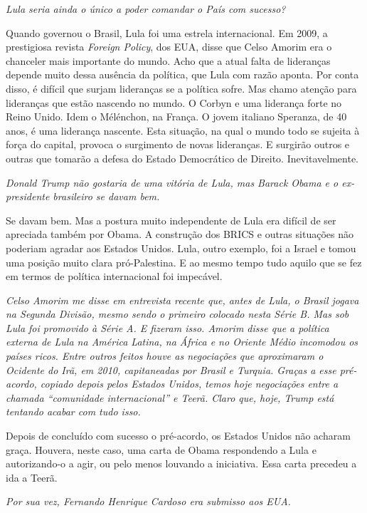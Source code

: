 \itshape
 Lula seria ainda o único a poder comandar o País com
sucesso?

\normalfont 
Quando governou o Brasil, Lula foi uma estrela
internacional. Em 2009, a prestigiosa revista \emph{Foreign Policy}, dos
EUA, disse que Celso Amorim era o chanceler mais importante do mundo.
Acho que a atual falta de lideranças depende muito dessa ausência da
política, que Lula com razão aponta. Por conta disso, é difícil que
surjam lideranças se a política sofre. Mas chamo atenção para lideranças
que estão nascendo no mundo. O Corbyn e uma liderança forte no Reino
Unido. Idem o Mélénchon, na França. O jovem italiano Speranza, de 40
anos, é uma liderança nascente. Esta situação, na qual o mundo todo se
sujeita à força do capital, provoca o surgimento de novas lideranças. E
surgirão outros e outras que tomarão a defesa do Estado Democrático de
Direito. Inevitavelmente.

\itshape
 Donald Trump não gostaria de uma vitória de Lula, mas
Barack Obama e o ex-presidente brasileiro se davam bem.

\normalfont 
Se davam bem. Mas a postura muito independente de Lula
era difícil de ser apreciada também por Obama. A construção dos BRICS e
outras situações não poderiam agradar aos Estados Unidos. Lula, outro
exemplo, foi a Israel e tomou uma posição muito clara pró-Palestina. E
ao mesmo tempo tudo aquilo que se fez em termos de política
internacional foi impecável.

\itshape
 Celso Amorim me disse em entrevista recente que, antes
de Lula, o Brasil jogava na Segunda Divisão, mesmo sendo o primeiro
colocado nesta Série B. Mas sob Lula foi promovido à Série A. E fizeram
isso. Amorim disse que a política externa de Lula na América Latina, na
África e no Oriente Médio incomodou os países ricos. Entre outros feitos
houve as negociações que aproximaram o Ocidente do Irã, em 2010,
capitaneadas por Brasil e Turquia. Graças a esse pré-acordo, copiado
depois pelos Estados Unidos, temos hoje negociações entre a chamada
``comunidade internacional'' e Teerã. Claro que, hoje, Trump está
tentando acabar com tudo isso.

\normalfont 
Depois de concluído com sucesso o pré-acordo, os Estados
Unidos não acharam graça. Houvera, neste caso, uma carta de Obama
respondendo a Lula e autorizando-o a agir, ou pelo menos louvando a
iniciativa. Essa carta precedeu a ida a Teerã.

\itshape
 Por sua vez, Fernando Henrique Cardoso era submisso aos
EUA.

